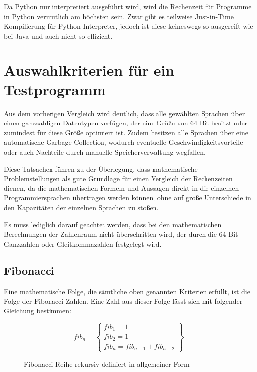 \documentclass[11pt, parskip=half]{scrartcl}       %
\begin{document}
Da Python nur interpretiert ausgeführt wird, wird die Rechenzeit für Programme in Python vermutlich am höchsten sein.
Zwar gibt es teilweise Just-in-Time Kompilierung für Python Interpreter, jedoch ist diese keineswegs so ausgereift wie bei Java und auch nicht so effizient.


\section{Auswahlkriterien für ein Testprogramm}

Aus dem vorherigen Vergleich wird deutlich, dass alle gewählten Sprachen über einen ganzzahligen Datentypen verfügen, der eine Größe von 64-Bit besitzt oder zumindest für diese Größe optimiert ist.
Zudem besitzen alle Sprachen über eine automatische Garbage-Collection, wodurch eventuelle Geschwindigkeitsvorteile oder auch Nachteile durch manuelle Speicherverwaltung wegfallen.

Diese Tatsachen führen zu der Überlegung, dass mathematische Problemstellungen als gute Grundlage für einen Vergleich der Rechenzeiten dienen, da die mathematischen Formeln und Aussagen direkt in die einzelnen Programmiersprachen übertragen werden können, ohne auf große Unterschiede in den Kapazitäten der einzelnen Sprachen zu stoßen.

Es muss lediglich darauf geachtet werden, dass bei den mathematischen Berechnungen der Zahlenraum nicht überschritten wird, der durch die 64-Bit Ganzzahlen oder Gleitkommazahlen festgelegt wird.


\subsection{Fibonacci}

Eine mathematische Folge, die sämtliche oben genannten Kriterien erfüllt, ist die Folge der Fibonacci-Zahlen.
Eine Zahl aus dieser Folge lässt sich mit folgender Gleichung bestimmen:

\begin{figure}[h]
  \centering
$$
fib _{n} = \left.
  \begin{cases}
    fib_{1} = 1 \\
    fib_{2} = 1 \\
    fib_{n} = fib_{n-1} + fib_{n-2}
  \end{cases}
\right\}
$$  
  \caption{Fibonacci-Reihe rekursiv definiert in allgemeiner Form}
  \label{fig:fib1}
\end{figure}
\end{document}
